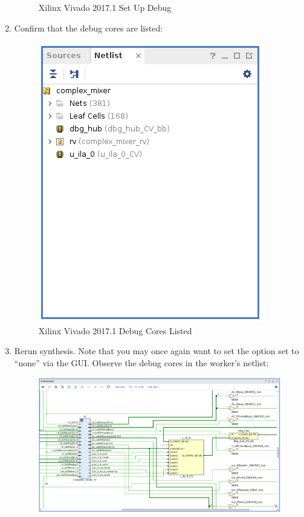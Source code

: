 \begin{flushleft}
\begin{enumerate}
\begin{figure}[H]
					\caption{Xilinx Vivado 2017.1 Set Up Debug}
			\end{figure}
		\item Confirm that the debug cores are listed:
			\begin{figure}[H]
				\centerline{\includegraphics[scale=0.6]			{figures/xilinx_vivado_2017_debug_cores_listed}}
					\caption{Xilinx Vivado 2017.1 Debug Cores Listed}
			\end{figure}
		\item Rerun synthesis. Note that you may once again want to set the  option set to ``none'' via the GUI. Observe the debug cores in the worker's netlist:
			\begin{figure}[H]
				\centerline{\includegraphics[scale=0.4]			{figures/xilinx_vivado_2017_debug_cores_schematic}}

\end{figure}
\end{enumerate}
\end{flushleft}
